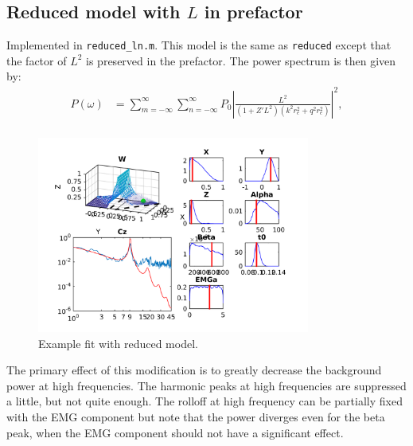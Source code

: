 \documentclass[10pt,a4paper]{article}
\begin{document}
\clearpage 

\subsection{Reduced model with $L$ in prefactor}
Implemented in {\tt reduced\_ln.m}. This model is the same as \texttt{reduced} except that the factor of $L^2$ is preserved in the prefactor. The power spectrum is then given by:
\begin{align}
	P(\omega) &= \sum_{m = -\infty}^{\infty}\sum_{n = -\infty}^{\infty} P_0 \left| \frac{L^2}{(1+Z'L^2)(k^2r_e^2+q^2r_e^2)}\right|^2,\\[14pt]
\end{align}

\begin{figure}[h!]
\begin{center}
\includegraphics[width=0.8\textwidth]{example_reduced_ln}
\caption{Example fit with reduced model.}
\label{fig:full}
\end{center}
\end{figure}

The primary effect of this modification is to greatly decrease the background power at high frequencies. The harmonic peaks at high frequencies are suppressed a little, but not quite enough. The rolloff at high frequency can be partially fixed with the EMG component but note that the power diverges even for the beta peak, when the EMG component should not have a significant effect.
\end{document}
